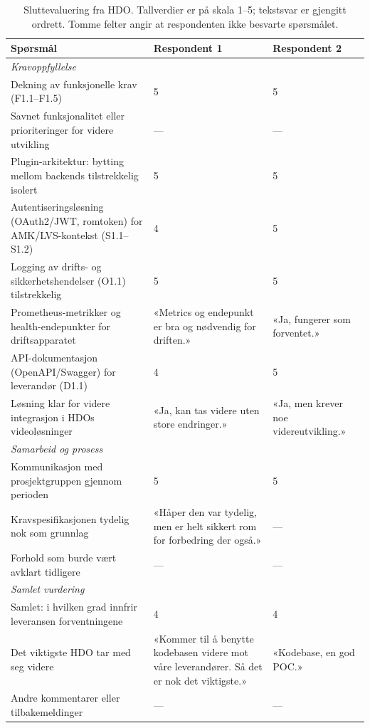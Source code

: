 \begin{table}[!htbp]
    \centering
    \footnotesize
    \renewcommand{\arraystretch}{1.25}
    \caption{Sluttevaluering fra HDO. Tallverdier er på skala
    1--5; tekstsvar er gjengitt ordrett. Tomme felter angir at
    respondenten ikke besvarte spørsmålet.}
    \label{tab:hdo-eval-full}
    \begin{tabular}{p{6.0cm} p{3.9cm} p{3.9cm}}
        \toprule
        \textbf{Spørsmål} & \textbf{Respondent 1} &
        \textbf{Respondent 2} \\
        \midrule
        \multicolumn{3}{l}{\textit{Kravoppfyllelse}} \\
        \midrule
        Dekning av funksjonelle krav (F1.1--F1.5) &
        5 & 5 \\
        Savnet funksjonalitet eller prioriteringer for videre
        utvikling &
        --- & --- \\
        Plugin-arkitektur: bytting mellom backends tilstrekkelig
        isolert &
        5 & 5 \\
        Autentiseringsløsning (OAuth2/JWT, romtoken) for
        AMK/LVS-kontekst (S1.1--S1.2) &
        4 & 5 \\
        Logging av drifts- og sikkerhetshendelser (O1.1)
        tilstrekkelig &
        5 & 5 \\
        Prometheus-metrikker og health-endepunkter for
        driftsapparatet &
        «Metrics og endepunkt er bra og nødvendig for driften.» &
        «Ja, fungerer som forventet.» \\
        API-dokumentasjon (OpenAPI/Swagger) for leverandør
        (D1.1) &
        4 & 5 \\
        Løsning klar for videre integrasjon i HDOs
        videoløsninger &
        «Ja, kan tas videre uten store endringer.» &
        «Ja, men krever noe videreutvikling.» \\
        \midrule
        \multicolumn{3}{l}{\textit{Samarbeid og prosess}} \\
        \midrule
        Kommunikasjon med prosjektgruppen gjennom perioden &
        5 & 5 \\
        Kravspesifikasjonen tydelig nok som grunnlag &
        «Håper den var tydelig, men er helt sikkert rom for
        forbedring der også.» &
        --- \\
        Forhold som burde vært avklart tidligere &
        --- & --- \\
        \midrule
        \multicolumn{3}{l}{\textit{Samlet vurdering}} \\
        \midrule
        Samlet: i hvilken grad innfrir leveransen
        forventningene &
        4 & 4 \\
        Det viktigste HDO tar med seg videre &
        «Kommer til å benytte kodebasen videre mot våre
        leverandører. Så det er nok det viktigste.» &
        «Kodebase, en god POC.» \\
        Andre kommentarer eller tilbakemeldinger &
        --- & --- \\
        \bottomrule
    \end{tabular}
\end{table}
